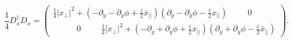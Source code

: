 \begin{equation}
\frac{1}{4}D_x^\dagger D_x=
\left(\begin{array}{cr}
\frac{1}{4}|x_\perp|^2+
(-\partial_y-\partial_y\phi+\frac{i}{2}\bar x_{||})
(\partial_{\bar y}-\partial_{\bar y}\phi-\frac{i}{2}x_{||})~~~~~~~~~~~0~~~~~
~~~~~~~~\\
~~~~~~~~~~~~~0~~~~~~~~~~~
\frac{1}{4}|x_\perp|^2+(-\partial_{\bar y}+\partial_{\bar y}
\phi+\frac{i}{2}x_{||})
(\partial_y+\partial_y\phi-\frac{i}{2}\bar x_{||})
\end{array}\right).
\end{equation}

